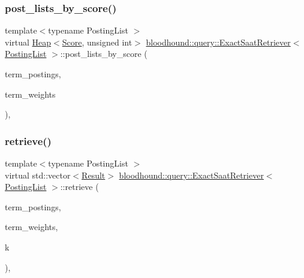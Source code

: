 \subsubsection{\texorpdfstring{post\+\_\+lists\+\_\+by\+\_\+score()}{post\_lists\_by\_score()}}
{\footnotesize\ttfamily template$<$typename Posting\+List $>$ \\
virtual \hyperlink{classbloodhound_1_1Heap}{Heap}$<$\hyperlink{structbloodhound_1_1Score}{Score}, unsigned int$>$ \hyperlink{classbloodhound_1_1query_1_1ExactSaatRetriever}{bloodhound\+::query\+::\+Exact\+Saat\+Retriever}$<$ \hyperlink{classbloodhound_1_1PostingList}{Posting\+List} $>$\+::post\+\_\+lists\+\_\+by\+\_\+score (\begin{DoxyParamCaption}\item[{const std\+::vector$<$ \hyperlink{classbloodhound_1_1PostingList}{Posting\+List} $>$ \&}]{term\+\_\+postings,  }\item[{const std\+::vector$<$ \hyperlink{structbloodhound_1_1Score}{Score} $>$ \&}]{term\+\_\+weights }\end{DoxyParamCaption})\hspace{0.3cm}{\ttfamily [inline]}, {\ttfamily [virtual]}}

\mbox{\label{classbloodhound_1_1query_1_1ExactSaatRetriever_aced2763cc2a4c12838fef4a20759049e}} 
\subsubsection{\texorpdfstring{retrieve()}{retrieve()}}
{\footnotesize\ttfamily template$<$typename Posting\+List $>$ \\
virtual std\+::vector$<$\hyperlink{structbloodhound_1_1query_1_1Result}{Result}$>$ \hyperlink{classbloodhound_1_1query_1_1ExactSaatRetriever}{bloodhound\+::query\+::\+Exact\+Saat\+Retriever}$<$ \hyperlink{classbloodhound_1_1PostingList}{Posting\+List} $>$\+::retrieve (\begin{DoxyParamCaption}\item[{const std\+::vector$<$ \hyperlink{classbloodhound_1_1PostingList}{Posting\+List} $>$ \&}]{term\+\_\+postings,  }\item[{const std\+::vector$<$ \hyperlink{structbloodhound_1_1Score}{Score} $>$ \&}]{term\+\_\+weights,  }\item[{std\+::size\+\_\+t}]{k }\end{DoxyParamCaption})\hspace{0.3cm}{\ttfamily [inline]}, {\ttfamily [virtual]}}



